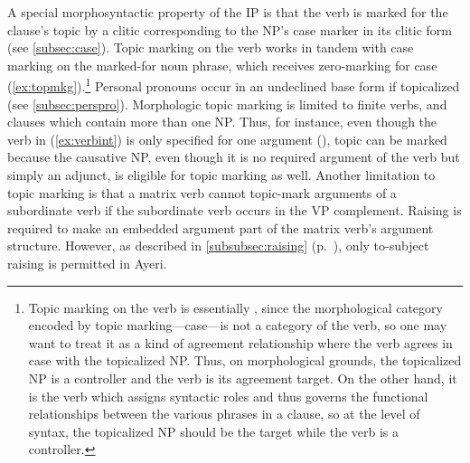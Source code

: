 A special morphosyntactic property of the IP is that the verb is marked for the
clause's topic by a clitic corresponding to the NP's case marker in its clitic
form (see \autoref{subsec:case}). Topic marking on the verb works in tandem
with case marking on the marked-for noun phrase, which receives zero-marking
for case (\ref{ex:topmkg}).\footnote{Topic marking on the verb is essentially
, since the morphological
category encoded by topic marking---case---is not a category of the verb, so
one may want to treat it as a kind of agreement relationship where the verb
agrees in case with the topicalized NP. Thus, on morphological grounds, the
topicalized NP is a controller and the verb is its agreement target. On the
other hand, it is the verb which assigns syntactic roles and thus governs the
functional relationships between the various phrases in a clause, so at the
level of syntax, the topicalized NP should be the target while the verb is a
controller.} Personal pronouns occur in an undeclined base form if topicalized
(see \autoref{subsec:perspro}). Morphologic topic marking is limited to finite
verbs, and clauses which contain more than one NP. Thus, for instance, even
though the verb in (\ref{ex:verbint}) is only specified for one argument
(\Aarg{}), topic can be marked because the causative NP, even though it is no
required argument of the verb but simply an adjunct, is eligible for topic
marking as well. Another limitation to topic marking is that a matrix verb
cannot topic-mark arguments of a subordinate verb if the subordinate verb
occurs in the VP complement. Raising is required to make an embedded argument
part of the matrix verb's argument structure. However, as described in
\autoref{subsubsec:raising} (p.~\pageref{subsubsec:raising}), only to-subject
raising is permitted in Ayeri.

